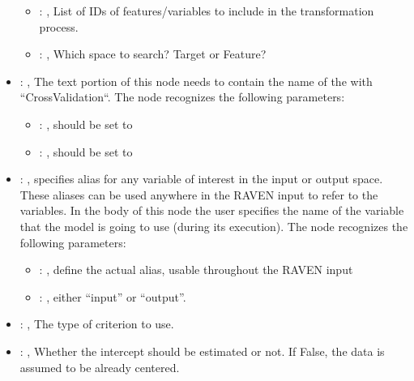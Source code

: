 \begin{itemize}
\begin{itemize}
        \item {}: , 
          List of IDs of features/variables to include in the transformation process.

        \item {}: , 
          Which space to search? Target or Feature?
      \end{itemize}

    \item {}: , 
      The text portion of this node needs to contain the name of the  with
               ``CrossValidation``.
      The  node recognizes the following parameters:
        \begin{itemize}
          \item {}: , 
            should be set to 
          \item {}: , 
            should be set to 
      \end{itemize}

    \item {}: , 
      specifies alias for         any variable of interest in the input or output space. These
      aliases can be used anywhere in the RAVEN input to         refer to the variables. In the body
      of this node the user specifies the name of the variable that the model is going to use
      (during its execution).
      The  node recognizes the following parameters:
        \begin{itemize}
          \item {}: , 
            define the actual alias, usable throughout the RAVEN input
          \item {}: , 
            either ``input'' or ``output''.
      \end{itemize}

    \item {}: , 
      The type of criterion to use.

    \item {}: , 
      Whether the intercept should be estimated or not. If False,
      the data is assumed to be already centered.


\end{itemize}
